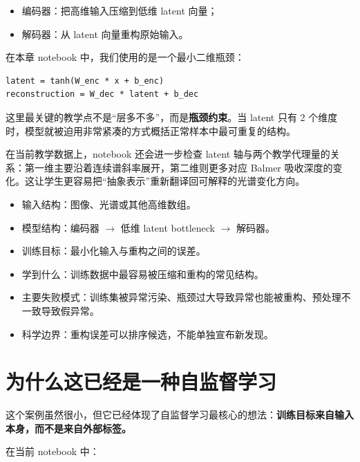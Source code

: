\begin{itemize}
    \item 编码器：把高维输入压缩到低维 latent 向量；
    \item 解码器：从 latent 向量重构原始输入。
\end{itemize}

在本章 notebook 中，我们使用的是一个最小二维瓶颈：

\begin{examplebox}[一个最小自编码器]
\begin{lstlisting}[style=pythonstyle]
latent = tanh(W_enc * x + b_enc)
reconstruction = W_dec * latent + b_dec
\end{lstlisting}
\end{examplebox}

这里最关键的教学点不是“层多不多”，而是\textbf{瓶颈约束}。当 latent 只有 2 个维度时，模型就被迫用非常紧凑的方式概括正常样本中最可重复的结构。

在当前教学数据上，notebook 还会进一步检查 latent 轴与两个教学代理量的关系：第一维主要沿着连续谱斜率展开，第二维则更多对应 Balmer 吸收深度的变化。这让学生更容易把“抽象表示”重新翻译回可解释的光谱变化方向。

\begin{examplebox}
\begin{itemize}
    \item 输入结构：图像、光谱或其他高维数组。
    \item 模型结构：编码器 $\rightarrow$ 低维 latent bottleneck $\rightarrow$ 解码器。
    \item 训练目标：最小化输入与重构之间的误差。
    \item 学到什么：训练数据中最容易被压缩和重构的常见结构。
    \item 主要失败模式：训练集被异常污染、瓶颈过大导致异常也能被重构、预处理不一致导致假异常。
    \item 科学边界：重构误差可以排序候选，不能单独宣布新发现。
\end{itemize}
\end{examplebox}

\section{为什么这已经是一种自监督学习}

这个案例虽然很小，但它已经体现了自监督学习最核心的想法：\textbf{训练目标来自输入本身，而不是来自外部标签。}

在当前 notebook 中：

